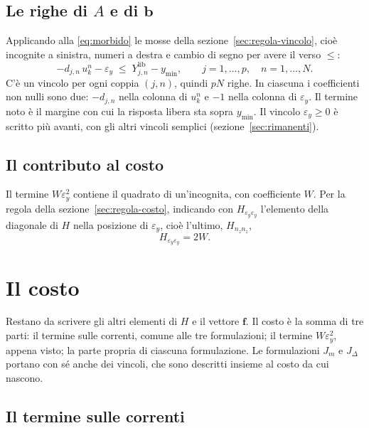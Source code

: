 \documentclass[11pt,a4paper]{article}
\newcommand{\vett}[1]{\boldsymbol{#1}}      %
\newcommand{\lib}{\mathrm{lib}}             %
\begin{document}
\subsection{Le righe di $A$ e di $\vett{b}$}

Applicando alla \eqref{eq:morbido} le mosse della
sezione~\ref{sec:regola-vincolo}, cioè incognite a sinistra, numeri a destra e
cambio di segno per avere il verso $\le$:
\begin{equation}
  -d_{j,n}\,u^n_k - \varepsilon_y \;\le\; Y^\lib_{j,n} - y_{\min} ,
  \qquad j = 1,\dots,p , \quad n = 1,\dots,N .
  \label{eq:riga-tensione}
\end{equation}
C'è un vincolo per ogni coppia $(j, n)$, quindi $pN$ righe. In ciascuna i
coefficienti non nulli sono due: $-d_{j,n}$ nella colonna di $u^n_k$ e $-1$ nella
colonna di $\varepsilon_y$. Il termine noto è il margine con cui la risposta libera sta
sopra $y_{\min}$. Il vincolo $\varepsilon_y \ge 0$ è scritto più avanti, con gli altri
vincoli semplici (sezione~\ref{sec:rimanenti}).

\subsection{Il contributo al costo}

Il termine $W \varepsilon_y^2$ contiene il quadrato di un'incognita, con coefficiente $W$.
Per la regola della sezione~\ref{sec:regola-costo}, indicando con
$H_{\varepsilon_y\varepsilon_y}$ l'elemento della diagonale di $H$ nella
posizione di $\varepsilon_y$, cioè l'ultimo, $H_{n_z n_z}$,
\begin{equation}
  H_{\varepsilon_y\varepsilon_y} = 2W .
  \label{eq:peso-e}
\end{equation}

\section{Il costo}\label{sec:costo}

Restano da scrivere gli altri elementi di $H$ e il vettore $\vett{f}$. Il costo è la
somma di tre parti: il termine sulle correnti, comune alle tre formulazioni;
il termine $W \varepsilon_y^2$, appena visto; la parte propria di ciascuna formulazione.
Le formulazioni $J_m$ e $J_\Delta$ portano con sé anche dei vincoli, che sono
descritti insieme al costo da cui nascono.

\subsection{Il termine sulle correnti}
\end{document}
